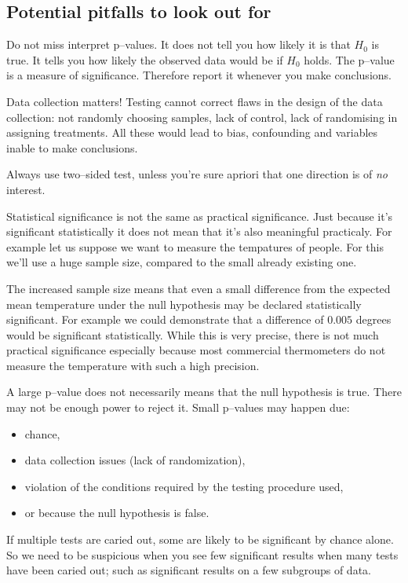 \subsection{Potential pitfalls to look out for}

Do not miss interpret p--values. It does not tell you how likely it is that
$H_0$ is true. It tells you how likely the observed data would be if $H_0$
holds. The p--value is a measure of significance. Therefore report it whenever
you make conclusions.

Data collection matters! Testing cannot correct flaws in the design of the data
collection: not randomly choosing samples, lack of control, lack of randomising
in assigning treatments. All these would lead to bias, confounding and variables
inable to make conclusions.

Always use two--sided test, unless you're sure apriori that one direction is of
\emph{no} interest.

Statistical significance is not the same as practical significance. Just because
it's significant statistically it does not mean that it's also meaningful
practicaly. For example let us suppose we want to measure the tempatures of
people. For this we'll use a huge sample size, compared to the small already
existing one.

The increased sample size means that even a small difference from the expected
mean temperature under the null hypothesis may be declared statistically significant.
For example we could demonstrate that a difference of $0.005$ degrees would be
significant statistically. While this is very precise, there is not much
practical significance especially because most commercial thermometers do not
measure the temperature with such a high precision.

A large p--value does not necessarily means that the null hypothesis is true.
There may not be enough power to reject it. Small p--values may happen due:

\begin{itemize}
  \item chance,
  \item data collection issues (lack of randomization),
  \item violation of the conditions required by the testing procedure used,
  \item or because the null hypothesis is false.
\end{itemize}

If multiple tests are caried out, some are likely to be significant by chance
alone. So we need to be suspicious when you see few significant results when
many tests have been caried out; such as significant results on a few subgroups
of data.

